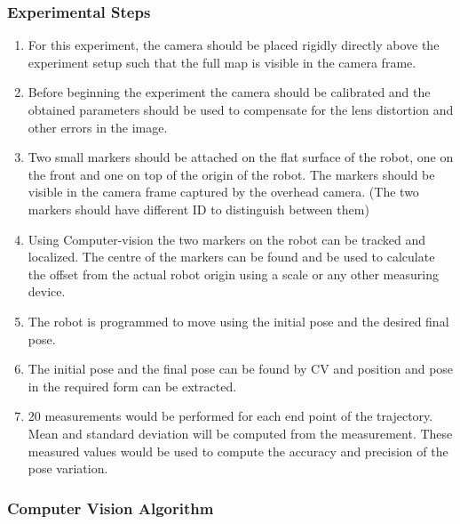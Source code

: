 \documentclass[10pt,a4paper]{article}
\begin{document}
	\subsubsection{Experimental Steps}
	
\begin{enumerate}
	\item
	For this experiment, the camera should be placed rigidly directly above the experiment setup such that the full map is visible in the camera frame. 
	\item
	Before beginning the experiment the camera should be calibrated and the obtained parameters should be used to compensate for the lens distortion and other errors in the image. 
	\item
	Two small markers should be attached on the flat surface of the robot, one on the front and one on top of the origin of the robot. The markers should be visible in the camera frame captured by the overhead camera. (The two markers should have different ID to distinguish between them)
	\item
    Using Computer-vision the two markers on the robot can be tracked and localized. The centre of the markers can be found and be used to calculate the offset from the actual robot origin using a scale or any other measuring device.
	\item
	The robot is programmed to move using the initial pose and the desired final pose.
	\item
	The initial pose and the final pose can be found by CV and position and pose in the required form can be extracted.
	\item
	20 measurements would be performed for each end point of the trajectory. Mean and standard deviation will be computed from the measurement. These measured values would be used to compute the accuracy and precision of the pose variation. 
	
\end{enumerate}
\vspace{0.5cm}

\subsubsection{Computer Vision Algorithm}
\end{document}
